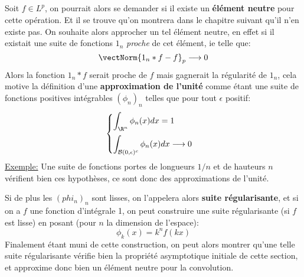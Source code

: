 \subsection*{}
Soit \( f \in L^p \), on pourrait alors se demander si il existe un \textbf{élément neutre} pour cette opération. Et il se trouve qu'on montrera dans le chapitre suivant qu'il n'en existe pas. On souhaite alors approcher un tel élément neutre, en effet si il existait une suite de fonctions \( 1_n \) \textit{proche} de cet élément, ie telle que:
\[ 
   \vectNorm{1_n * f - f}_p \longrightarrow 0
\]
Alors la fonction \( 1_n * f \) serait proche de \( f \) mais gagnerait la régularité de \( 1_n \), cela motive la définition d'une \textbf{approximation de l'unité} comme étant une suite de fonctions positives intégrables \( (\phi_n)_n \) telles que pour tout \( \epsilon \) positif:
\[ 
   \begin{cases}
      \displaystyle \int_{\R^n} \phi_n(x) dx = 1\vspace{5pt} \\
      \displaystyle \int_{\mathcal{B}(0, \epsilon)^c} \phi_n(x) dx \longrightarrow 0
   \end{cases} 
\]
\uline{Exemple:} Une suite de fonctions portes de longueurs \( 1/n \) et de hauteurs \( n \) vérifient bien ces hypothèses, ce sont donc des approximations de l'unité.\<

Si de plus les \( (phi_n)_n \) sont lisses, on l'appelera alors \textbf{suite régularisante}, et si on a \( f \) une fonction d'intégrale 1, on peut construire une suite régularisante (si \( f \) est lisse) en posant (pour \( n \) la dimension de l'espace):
\[ 
   \phi_k(x) = k^n f(kx)
\]
Finalement étant muni de cette construction, on peut alors montrer qu'une telle suite régularisante vérifie bien la propriété asymptotique initiale de cette section, et approxime donc bien un élément neutre pour la convolution.


